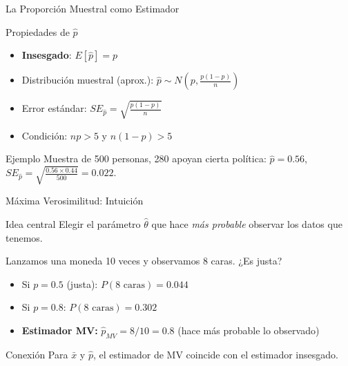 \documentclass[aspectratio=169,11pt]{beamer}
\begin{document}
\begin{frame}{La Proporción Muestral como Estimador}
\small
\begin{block}{Propiedades de $\hat{p}$}
\begin{itemize}\setlength{\itemsep}{1pt}
  \item \textbf{Insesgado}: $E[\hat{p}] = p$
  \pause
  \item Distribución muestral (aprox.): $\hat{p} \sim N\!\left(p, \frac{p(1-p)}{n}\right)$
  \pause
  \item Error estándar: $SE_{\hat{p}} = \sqrt{\frac{p(1-p)}{n}}$
  \pause
  \item Condición: $np > 5$ y $n(1-p) > 5$
\end{itemize}
\end{block}

\pause
\vspace{0.1cm}

\begin{exampleblock}{Ejemplo}
Muestra de 500 personas, 280 apoyan cierta política: $\hat{p} = 0.56$, $SE_{\hat{p}} = \sqrt{\frac{0.56 \times 0.44}{500}} = 0.022$.
\end{exampleblock}
\end{frame}

\begin{frame}{Máxima Verosimilitud: Intuición}
\small
\begin{block}{Idea central}
Elegir el parámetro $\hat{\theta}$ que hace \textit{más probable} observar los datos que tenemos.
\end{block}

\pause

\begin{example}
Lanzamos una moneda 10 veces y observamos 8 caras. ¿Es justa?
\begin{itemize}\setlength{\itemsep}{0pt}
  \item Si $p = 0.5$ (justa): $P(\text{8 caras}) = 0.044$
  \item Si $p = 0.8$: $P(\text{8 caras}) = 0.302$
  \pause
  \item \textbf{Estimador MV:} $\hat{p}_{MV} = 8/10 = 0.8$ (hace más probable lo observado)
\end{itemize}
\end{example}

\pause

\begin{alertblock}{Conexión}
Para $\bar{x}$ y $\hat{p}$, el estimador de MV coincide con el estimador insesgado.
\end{alertblock}
\end{frame}
\end{document}
